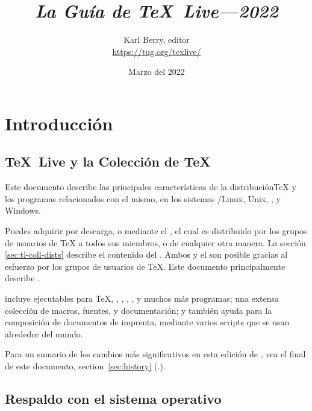 \documentclass{article}
\begin{document}
\title{%
{\huge \textit{La Guía de \TeX\ Live---2022}}}

\author{Karl Berry, editor \\[3mm]
        \url{https://tug.org/texlive/}}

\date{Marzo del 2022}

\maketitle

\begin{multicols}{2}
\tableofcontents
\end{multicols}

\section{Introducción}
\label{sec:intro}

\subsection{\TeX\ Live y la Colección de \TeX\ }


Este documento describe las principales características de la
distribución\Dash \TeX{} y los programas relacionados con el mismo, en
los sistemas \GNU/Linux, Unix, \MacOSX, y Windows.

Puedes adquirir \TL{} por descarga, o mediante el \TK{} \DVD, el
cual es distribuido por los grupos de usuarios de \TeX{} a todos sus
miembros, o de cualquier otra manera. La sección
\ref{sec:tl-coll-dists} describe el contenido del \DVD. Ambos \TL{} y
el \TK{} son posible gracias al esfuerzo por los grupos de usuarios de
\TeX{}. Este documento principalmente describe \TL{}.

\TL{} incluye ejecutables para \TeX{}, \LaTeXe{}, \ConTeXt, \MF, \MP,
\BibTeX{} y muchos más programas; una extensa colección de macros,
fuentes, y documentación; y también ayuda para la composición de
documentos de imprenta, mediante varios scripts que se usan alrededor
del mundo.

Para un sumario de los cambios más significativos en esta edición de
\TL{}, vea el final de este documento, section~\ref{sec:history}
(\p.\pageref{sec:history}).

\subsection{Respaldo con el sistema operativo}
\label{sec:os-support}
\end{document}
